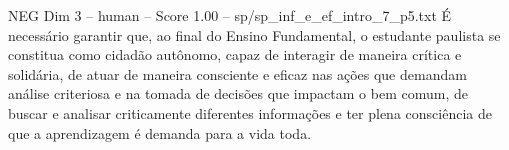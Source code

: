\begin{textsample}{NEG Dim 3 – human – Score 1.00 – sp/sp\_inf\_e\_ef\_intro\_7\_p5.txt}  \label{ex:f3_neg_004}
É necessário garantir que, ao final do Ensino Fundamental, o estudante paulista se constitua como cidadão autônomo, capaz de interagir de maneira crítica e solidária, de atuar de maneira consciente e eficaz nas ações que demandam análise criteriosa e na tomada de decisões que impactam o bem comum, de buscar e analisar criticamente diferentes informações e ter plena consciência de que a aprendizagem é demanda para a vida toda.

\end{textsample}
